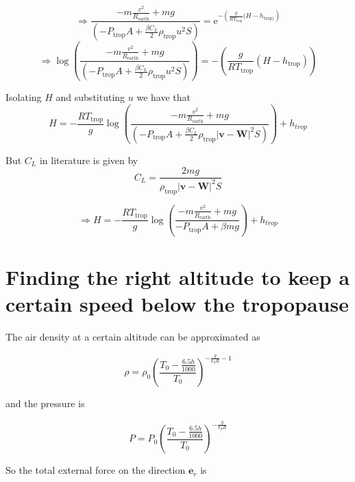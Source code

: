 \documentclass{article}
\renewcommand{\vec}[1]{\boldsymbol{#1}}
\begin{document}
\begin{equation}
  \Rightarrow \frac{-m\frac{v^2}{R_{\text{earth}}} +mg}{\left(-  P_{\text{trop}}A +\frac{\beta C_L}{2} \rho_{\text{trop}} u^2S\right)}=  \mathrm{e}^{-\left( \frac{g}{RT_{\text{trop}}}(H-h_{\text{trop})} \right)}    
\end{equation}
\begin{equation}
  \Rightarrow \log \left(\frac{-m\frac{v^2}{R_{\text{earth}}} +mg}{\left(-  P_{\text{trop}}A +\frac{\beta C_L}{2} \rho_{\text{trop}} u^2S\right)}\right)=  -\left( \frac{g}{RT_{\text{trop}}}(H-h_{\text{trop}}) \right)    
\end{equation}

Isolating $H$ and substituting $u$ we have that
\begin{equation}
    H= - \frac{RT_{\text{trop}}}{g}\log \left(\frac{-m\frac{v^2}{R_{\text{earth}}} +mg}{\left(-  P_{\text{trop}}A +\frac{\beta C_L}{2} \rho_{\text{trop}} |\vec v-\vec W|^2S\right)}\right)+h_{trop}
\end{equation}

 But $C_L$ in literature is given by
\begin{equation}
    C_L= \frac{2mg}{\rho_{\text{trop}} |\vec v-\vec W|^2S}
\end{equation}

\begin{equation}
    \Rightarrow H= - \frac{RT_{\text{trop}}}{g}\log \left(\frac{-m\frac{v^2}{R_{\text{earth}}} +mg}{-  P_{\text{trop}}A +\beta mg }\right)+h_{trop}
\end{equation}

\section{Finding the right altitude to keep a certain speed below the tropopause}

The air density at a certain altitude can be approximated as

\begin{equation}
    \rho= \rho_0 \left(\frac{T_0-\frac{6.5h}{1000}}{T_0}\right)^{-\frac{g}{k_TR}-1}
\end{equation}

and the pressure is 

\begin{equation}
    P=P_0\left(\frac{T_0-\frac{6.5h}{1000}}{T_0}\right)^{-\frac{g}{k_TR}}
\end{equation}

So the total external force on the direction $\vec{e}_r$ is 
\end{document}
